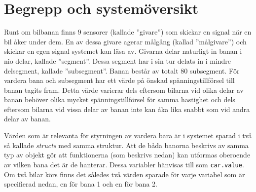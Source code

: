 \section{Begrepp och systemöversikt}

Runt om bilbanan finns 9 sensorer (kallade ''givare'') som skickar en signal när
en bil åker under dem. En av dessa givare agerar målgång (kallad ''målgivare'')
och skickar en egen signal systemet kan läsa av. Givarna delar naturligt in
banan i nio delar, kallade ''segment''. Dessa segment har i sin tur delats in i
mindre delsegment, kallade ''subsegment''. Banan består av totalt 80 subsegment.
För vardera bana och subsegment har ett värde på önskad spänningstillförsel till
banan tagits fram. Detta värde varierar dels eftersom bilarna vid olika delar av
banan behöver olika mycket spänningstillförsel för samma hastighet och dels
eftersom bilarna vid vissa delar av banan inte kan åka lika snabbt som vid andra
delar av banan.

Värden som är relevanta för styrningen av vardera bara är i systemet sparad i
två så kallade \emph{structs} med samma struktur. Att de båda banorna beskrivs
av samma typ av objekt gör att funktionerna (som beskrivs nedan) kan utformas
oberoende av vilken bana det är de hanterar. Dessa variabler hänvisas till som
\texttt{car.value}. Om två bilar körs finns det således två värden sparade för
varje variabel som är specifierad nedan, en för bana 1 och en för bana 2.

